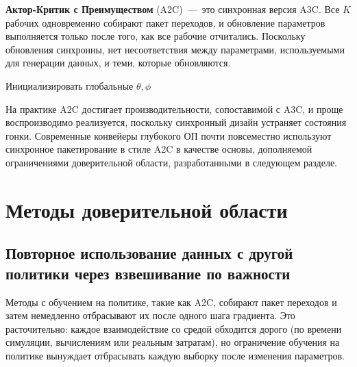 \textbf{Актор-Критик с Преимуществом} (A2C) \,---\, это синхронная версия A3C. Все $K$ рабочих одновременно собирают пакет переходов, и обновление параметров выполняется только после того, как все рабочие отчитались. Поскольку обновления синхронны, нет несоответствия между параметрами, используемыми для генерации данных, и теми, которые обновляются.

\begin{algorithm}[ht]
\caption{Актор-Критик с Преимуществом (A2C)}
\label{alg:a2c}
\DontPrintSemicolon
{}
Инициализировать глобальные $\theta, \phi$\;
\end{algorithm}

На практике A2C достигает производительности, сопоставимой с A3C, и проще воспроизводимо реализуется, поскольку синхронный дизайн устраняет состояния гонки. Современные конвейеры глубокого ОП почти повсеместно используют синхронное пакетирование в стиле A2C в качестве основы, дополняемой ограничениями доверительной области, разработанными в следующем разделе.

\section{Методы доверительной области}
\label{sec:trpo}

\subsection{Повторное использование данных с другой политики через взвешивание по важности}

Методы с обучением на политике, такие как A2C, собирают пакет переходов и затем немедленно отбрасывают их после одного шага градиента. Это расточительно: каждое взаимодействие со средой обходится дорого (по времени симуляции, вычислениям или реальным затратам), но ограничение обучения на политике вынуждает отбрасывать каждую выборку после изменения параметров.

